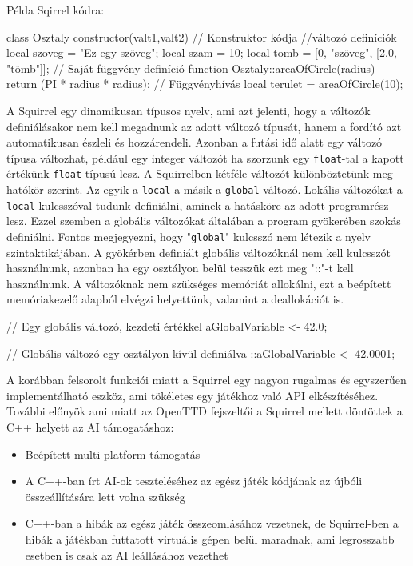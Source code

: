 Példa Sqirrel kódra:

\begin{cpp}
class Osztaly
{
  constructor(valt1,valt2)
  {
    // Konstruktor kódja
  }
  //változó definíciók
  local szoveg = "Ez egy szöveg";
  local szam = 10;
  local tomb = [0, "szöveg", [2.0, "tömb"]];
}
// Saját függvény definíció
function Osztaly::areaOfCircle(radius) {
  return (PI * radius * radius);
}
// Függvényhívás
local terulet = areaOfCircle(10);
\end{cpp}

A Squirrel egy dinamikusan típusos nyelv, ami azt jelenti, hogy a változók definiálásakor nem kell megadnunk az adott változó típusát, hanem a fordító azt automatikusan észleli és hozzárendeli. Azonban a futási idő alatt egy változó típusa változhat, például egy integer változót ha szorzunk egy \texttt{float}-tal a kapott értékünk \texttt{float} típusú lesz. A Squirrelben kétféle változót különböztetünk meg hatókör szerint. Az egyik a \texttt{local} a másik a \texttt{global} változó. Lokális változókat a \texttt{local} kulcsszóval tudunk definiálni, aminek a hatásköre az adott programrész lesz. Ezzel szemben a globális változókat általában a program gyökerében szokás definiálni. Fontos megjegyezni, hogy "\texttt{global}" kulcsszó nem létezik a nyelv szintaktikájában. A gyökérben definiált globális változóknál nem kell kulcsszót használnunk, azonban ha egy osztályon belül tesszük ezt meg "::"-t kell használnunk. A változóknak nem szükséges memóriát allokálni, ezt a beépített memóriakezelő alapból elvégzi helyettünk, valamint a deallokációt is.

\begin{cpp}
// Egy globális változó, kezdeti értékkel
aGlobalVariable <- 42.0;

// Globális változó egy osztályon kívül definiálva
::aGlobalVariable <- 42.0001;
\end{cpp}

A korábban felsorolt funkciói miatt a Squirrel egy nagyon rugalmas és egyszerűen implementálható eszköz, ami tökéletes egy játékhoz való API elkészítéséhez. További előnyök ami miatt az OpenTTD fejszeltői a Squirrel mellett döntöttek a C++ helyett az AI támogatáshoz\cite{wisniewski2011artificial}:

\begin{itemize}
	\item Beépített multi-platform támogatás
	\item A C++-ban írt AI-ok teszteléséhez az egész játék kódjának az újbóli összeállítására lett volna szükség
	\item C++-ban a hibák az egész játék összeomlásához vezetnek, de Squirrel-ben a hibák a játékban futtatott virtuális gépen belül maradnak, ami legrosszabb esetben is csak az AI leállásához vezethet
\end{itemize}

